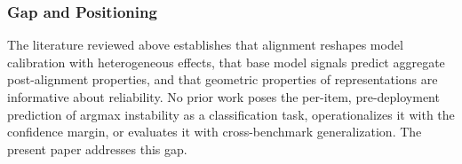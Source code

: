 \subsubsection{Gap and Positioning}

The literature reviewed above establishes that alignment reshapes model calibration with heterogeneous effects, that base model signals predict aggregate post-alignment properties, and that geometric properties of representations are informative about reliability. No prior work poses the per-item, pre-deployment prediction of argmax instability as a classification task, operationalizes it with the confidence margin, or evaluates it with cross-benchmark generalization. The present paper addresses this gap.

